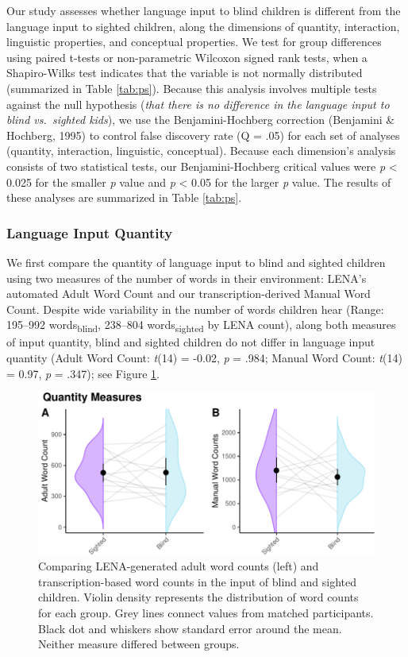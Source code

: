 \documentclass[
  man]{apa6}
\begin{document}
Our study assesses whether language input to blind children is different from the language input to sighted children, along the dimensions of quantity, interaction, linguistic properties, and conceptual properties. We test for group differences using paired t-tests or non-parametric Wilcoxon signed rank tests, when a Shapiro-Wilks test indicates that the variable is not normally distributed (summarized in Table \ref{tab:ps}). Because this analysis involves multiple tests against the null hypothesis (\emph{that there is no difference in the language input to blind vs.~sighted kids}), we use the Benjamini-Hochberg correction (Benjamini \& Hochberg, 1995) to control false discovery rate (Q = .05) for each set of analyses (quantity, interaction, linguistic, conceptual). Because each dimension's analysis consists of two statistical tests, our Benjamini-Hochberg critical values were \emph{p} \textless{} 0.025 for the smaller \emph{p} value and \emph{p} \textless{} 0.05 for the larger \emph{p} value. The results of these analyses are summarized in Table \ref{tab:ps}.

\hypertarget{language-input-quantity}{%
\subsubsection{Language Input Quantity}\label{language-input-quantity}}

We first compare the quantity of language input to blind and sighted children using two measures of the number of words in their environment: LENA's automated Adult Word Count and our transcription-derived Manual Word Count. Despite wide variability in the number of words children hear (Range: 195--992 words\textsubscript{blind}, 238--804 words\textsubscript{sighted} by LENA count), along both measures of input quantity, blind and sighted children do not differ in language input quantity (Adult Word Count: \emph{t}(14) = -0.02, \emph{p} = .984; Manual Word Count: \emph{t}(14) = 0.97, \emph{p} = .347); see Figure \ref{fig:quantity-plots}.

\begin{figure}
\centering
\includegraphics{input_quality_manuscript_files/figure-latex/quantity-plots-1.pdf}
\caption{\label{fig:quantity-plots}Comparing LENA-generated adult word counts (left) and transcription-based word counts in the input of blind and sighted children. Violin density represents the distribution of word counts for each group. Grey lines connect values from matched participants. Black dot and whiskers show standard error around the mean. Neither measure differed between groups.}
\end{figure}
\end{document}
